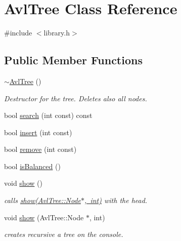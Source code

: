 \hypertarget{class_avl_tree}{}\section{Avl\+Tree Class Reference}
\label{class_avl_tree}


{\ttfamily \#include $<$library.\+h$>$}

\subsection*{Public Member Functions}
\begin{DoxyCompactItemize}
\item 
\mbox{\hyperlink{class_avl_tree_ada89cb30925d36a56e3aab8768752468}{$\sim$\+Avl\+Tree}} ()
\begin{DoxyCompactList}\small\item\em Destructor for the tree. Deletes also all nodes. \end{DoxyCompactList}\item 
bool \mbox{\hyperlink{class_avl_tree_a62f478c45b1505e637617a5a8edb9374}{search}} (int const) const
\item 
bool \mbox{\hyperlink{class_avl_tree_a251736611b07cd83fe02f399288fc92e}{insert}} (int const)
\item 
bool \mbox{\hyperlink{class_avl_tree_a9f580161de922fdd2ddb826cc8d8436f}{remove}} (int const)
\item 
bool \mbox{\hyperlink{class_avl_tree_af8f43d1139179e490fffbdd03f7735ac}{is\+Balanced}} ()
\item 
void \mbox{\hyperlink{class_avl_tree_a0c18b4848eb2a6d5876afb6ea203b7f1}{show}} ()
\begin{DoxyCompactList}\small\item\em calls \mbox{\hyperlink{class_avl_tree_ab468a9e24161484f610c4193256d4f00}{show(\+Avl\+Tree\+::\+Node$\ast$, int)}} with the head. \end{DoxyCompactList}\item 
void \mbox{\hyperlink{class_avl_tree_ab468a9e24161484f610c4193256d4f00}{show}} (Avl\+Tree\+::\+Node $\ast$, int)
\begin{DoxyCompactList}\small\item\em creates recursive a tree on the console. \end{DoxyCompactList}\end{DoxyCompactItemize}
